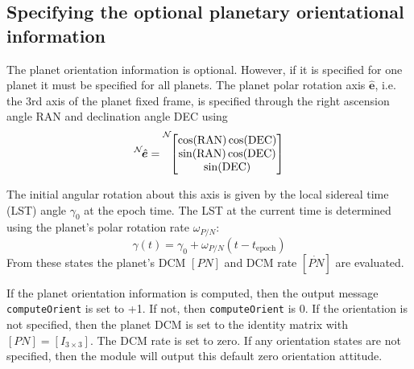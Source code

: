 \subsection{Specifying the optional planetary orientational information}
The planet orientation information is optional.  However, if it is specified for one planet it must be specified for all planets.  The planet polar rotation axis $\hat{\bm e}$, i.e. the 3rd axis of the planet fixed frame, is specified through the right ascension angle RAN and declination angle DEC using
\begin{equation}
	\leftexp{N}{\hat{\bm e}} = \leftexp{N}{\begin{bmatrix}
		\cos(\text{RAN}) \cos(\text{DEC}) \\
		\sin(\text{RAN}) \cos(\text{DEC}) \\
		\sin(\text{DEC})
	\end{bmatrix}}
\end{equation}

The initial angular rotation about this axis is given by the local sidereal time (LST) angle $\gamma_{0}$ at the epoch time.  The LST at the current time is determined using the planet's polar rotation rate $\omega_{P/N}$:
\begin{equation}
	\gamma(t) = \gamma_{0} + \omega_{P/N} (t - t_{\text{epoch}})
\end{equation}
From these states the planet's DCM $[PN]$ and DCM rate $[\dot{PN}]$ are evaluated.

If the planet orientation information is computed, then the output message {\tt computeOrient} is set to +1.  If not, then {\tt computeOrient} is 0.  If the orientation is not specified, then the planet DCM is set to the identity matrix with $[PN] = [I_{3\times 3}]$.  The DCM rate is set to zero.  If any orientation states are not specified, then the module will output this default zero orientation attitude.  